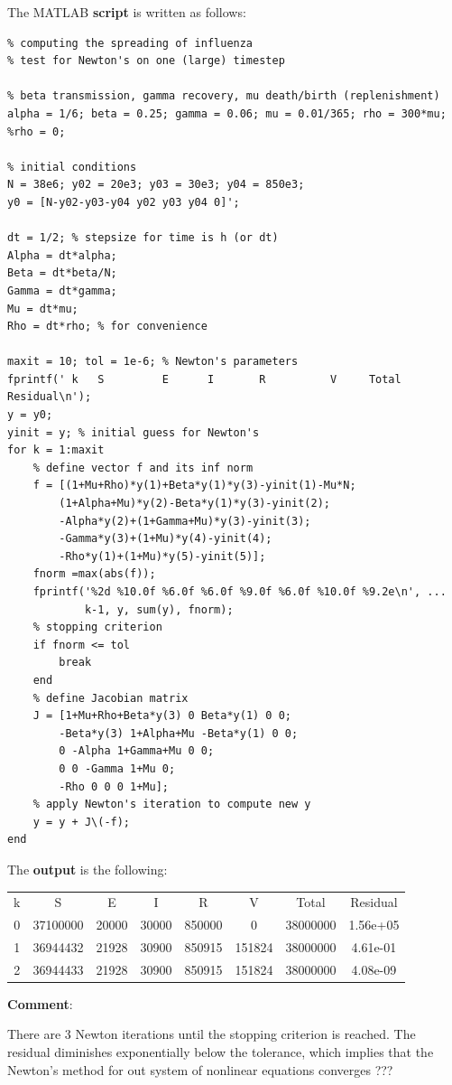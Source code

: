 \documentclass[12pt]{article}
\begin{document}
The MATLAB \textbf{script} is written as follows:
\begin{lstlisting}
% computing the spreading of influenza
% test for Newton's on one (large) timestep

% beta transmission, gamma recovery, mu death/birth (replenishment)
alpha = 1/6; beta = 0.25; gamma = 0.06; mu = 0.01/365; rho = 300*mu;
%rho = 0;

% initial conditions
N = 38e6; y02 = 20e3; y03 = 30e3; y04 = 850e3;
y0 = [N-y02-y03-y04 y02 y03 y04 0]';

dt = 1/2; % stepsize for time is h (or dt)
Alpha = dt*alpha;
Beta = dt*beta/N; 
Gamma = dt*gamma; 
Mu = dt*mu; 
Rho = dt*rho; % for convenience

maxit = 10; tol = 1e-6; % Newton's parameters
fprintf(' k   S         E      I       R          V     Total     Residual\n');
y = y0;
yinit = y; % initial guess for Newton's
for k = 1:maxit
    % define vector f and its inf norm
    f = [(1+Mu+Rho)*y(1)+Beta*y(1)*y(3)-yinit(1)-Mu*N;
        (1+Alpha+Mu)*y(2)-Beta*y(1)*y(3)-yinit(2);
        -Alpha*y(2)+(1+Gamma+Mu)*y(3)-yinit(3);
        -Gamma*y(3)+(1+Mu)*y(4)-yinit(4);
        -Rho*y(1)+(1+Mu)*y(5)-yinit(5)];
    fnorm =max(abs(f));
    fprintf('%2d %10.0f %6.0f %6.0f %9.0f %6.0f %10.0f %9.2e\n', ...
            k-1, y, sum(y), fnorm);
    % stopping criterion
    if fnorm <= tol
        break
    end
    % define Jacobian matrix
    J = [1+Mu+Rho+Beta*y(3) 0 Beta*y(1) 0 0;
        -Beta*y(3) 1+Alpha+Mu -Beta*y(1) 0 0;
        0 -Alpha 1+Gamma+Mu 0 0;
        0 0 -Gamma 1+Mu 0;
        -Rho 0 0 0 1+Mu];
    % apply Newton's iteration to compute new y
    y = y + J\(-f);
end
\end{lstlisting}

The \textbf{output} is the following:
\begin{center}
\begin{tabular}{ c c c c c c c c }
 k &  S     &    E  &    I  &     R     &     V   &  Total & Residual\\
 0 &  37100000 & 20000 & 30000  &  850000   &   0 &  38000000 & 1.56e+05\\
 1 & 36944432 & 21928 & 30900  &  850915 & 151824 &  38000000 & 4.61e-01\\
 2 &  36944433 & 21928 & 30900  &  850915 & 151824 &  38000000 & 4.08e-09  \\
\end{tabular}
\end{center}
\textbf{Comment}:

There are 3 Newton iterations until the stopping criterion is reached. The residual diminishes exponentially below the tolerance, which implies that the Newton's method for out system of nonlinear equations converges ???
\end{document}
